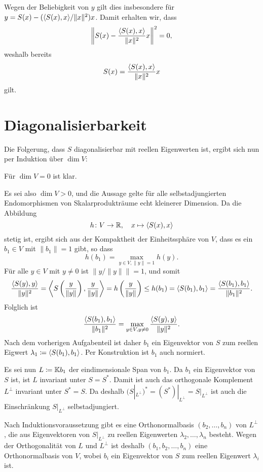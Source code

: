 \documentclass[a4paper,10pt]{scrartcl}
\begin{document}
Wegen der Beliebigkeit von $y$ gilt dies insbesondere für $y = S(x) - (\langle S(x),x \rangle/\|x\|^2) x$.
Damit erhalten wir, dass
\[
  \left\| S(x) - \frac{\langle S(x),x \rangle}{\|x\|^2} x \right\|^2 = 0,
\]
weshalb bereits
\[
  S(x) = \frac{\langle S(x),x \rangle}{\|x\|^2} x
\]
gilt.










\section{Diagonalisierbarkeit}


Die Folgerung, dass $S$ diagonalisierbar mit reellen Eigenwerten ist, ergibt sich nun per Induktion über $\dim V$:

Für $\dim V = 0$ ist klar.

Es sei also $\dim V > 0$, und die Aussage gelte für alle selbstadjungierten Endomorphismen von Skalarprodukträume echt kleinerer  Dimension.
Da die Abbildung
\[
  h \colon V \to \mathbb{R},
  \quad
  x \mapsto \langle S(x),x \rangle
\]
stetig ist, ergibt sich aus der Kompaktheit der Einheitssphäre von $V$, dass es ein $b_1 \in V$ mit $\|b_1\| = 1$ gibt, so dass
\[
  h(b_1) = \max_{y \in V, \|y\| = 1} h(y).
\]
Für alle $y \in V$ mit $y \neq 0$ ist $\| y/\|y\| \| = 1$, und somit
\[
        \frac{\langle S(y), y \rangle}{\|y\|^2}
  =     \left\langle S\left( \frac{y}{\|y\|} \right), \frac{y}{\|y\|} \right\rangle
  =     h\left( \frac{y}{\|y\|} \right)
  \leq  h(b_1)
  =     \langle S(b_1), b_1 \rangle
  =     \frac{ \langle S(b_1), b_1 \rangle }{ \|b_1\|^2 }.
\]
Folglich ist
\[
    \frac{ \langle S(b_1), b_1 \rangle }{ \|b_1\|^2 }
  = \max_{y \in V, y \neq 0} \frac{ \langle S(y), y \rangle }{ \|y\|^2 }.
\]
Nach dem vorherigen Aufgabenteil ist daher $b_1$ ein Eigenvektor von $S$ zum reellen Eigwert $\lambda_1 \coloneqq \langle S(b_1), b_1 \rangle$.
Per Konstruktion ist $b_1$ auch normiert.

Es sei nun $L \coloneqq \mathbb{K} b_1$ der eindimensionale Span von $b_1$.
Da $b_1$ ein Eigenvektor von $S$ ist, ist $L$ invariant unter $S = S^*$.
Damit ist auch das orthogonale Komplement $L^\perp$ invariant unter $S^* = S$.
Da deshalb $(S|_{L^\perp})^* = (S^*)|_{L^\perp} = S|_{L^\perp}$ ist auch die Einschränkung $S|_{L^\perp}$ selbstadjungiert.

Nach Induktionsvoraussetzung gibt es eine Orthonormalbasis $(b_2, \dotsc, b_n)$ von $L^\perp$, die aus Eigenvektoren von $S|_{L^\perp}$ zu reellen Eigenwerten $\lambda_2, \dotsc, \lambda_n$ besteht.
Wegen der Orthogonalität von $L$ und $L^\perp$ ist deshalb $(b_1, b_2, \dotsc, b_n)$ eine Orthonormalbasis von $V$, wobei $b_i$ ein Eigenvektor von $S$ zum reellen Eigenwert $\lambda_i$ ist.
\end{document}
